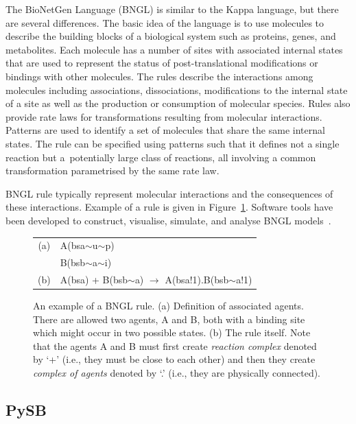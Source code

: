 \documentclass[11pt,a4paper]{report}
\begin{document}
The BioNetGen Language (BNGL) \cite{harris2016bionetgen} is similar to the Kappa language, but there are several differences. The basic idea of the language is to use molecules to describe the building blocks of a biological system such as proteins, genes, and metabolites. Each molecule has a number of sites with associated internal states that are used to represent the status of post-translational modifications or bindings with other molecules. The rules describe the interactions among molecules including associa­tions, dissociations, modifications to the internal state of a site as well as the production or consumption of molecular species. Rules also provide rate laws for transformations resulting from molecular interactions. Patterns are used to identify a set of molecules that share the same internal states. The rule can be specified using patterns such that it defines not a single reaction but a~potentially large class of reactions, all involving a common transformation parametrised by the same rate law.

BNGL rule typically represent molecular interactions and the consequences of these interactions. Example of a rule is given in Figure~\ref{bngl-rule}. Software tools have been developed to construct, visualise, simulate, and analyse BNGL models~\cite{wenskovitch2014mosbie,harris2016bionetgen,xu2011rulebender,sneddon2011efficient}.

\begin{figure}[!h]
\begin{center}
\begin{tabular}{c l}
(a) & A(bsa$\sim$u$\sim$p) \\
  & B(bsb$\sim$a$\sim$i) \\
(b) & A(bsa) + B(bsb$\sim$a) $\rightarrow$ A(bsa!1).B(bsb$\sim$a!1) \\
\end{tabular}
\end{center}
\caption{An example of a BNGL rule. (a) Definition of associated agents. There are allowed two agents, A and B, both with a binding site which might occur in two possible states. (b) The rule itself. Note that the agents A and B must first create \emph{reaction complex} denoted by `+' (i.e., they must be close to each other) and then they create \emph{complex of agents} denoted by `.' (i.e., they are physically connected).}\label{bngl-rule}
\end{figure}

\subsection{PySB}
\end{document}
